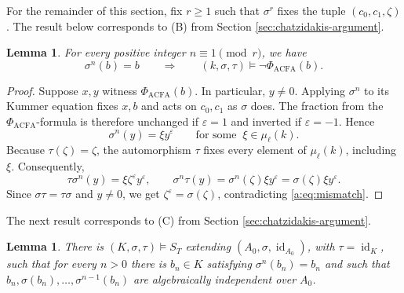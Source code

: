 \documentclass[11pt,a4paper]{amsart}
\renewcommand{\ge}{\geqslant}
\newtheorem{lemma}[theorem]{Lemma}
\theoremstyle{definition}
\DeclareMathOperator{\id}{id}
\begin{document}
For the remainder of this section, fix $r\ge1$ such that
$\sigma^r$ fixes the tuple $(c_0,c_1,\zeta)$. The result below corresponds to (B) from Section \ref{sec:chatzidakis-argument}.
\begin{lemma}\label{a:lem:obstruction}
For every positive integer $n\equiv1\pmod r$, we have
\[
\sigma^n(b)=b
\qquad\Longrightarrow\qquad
(k,\sigma,\tau)\models\neg\Phi_{\mathrm{ACFA}}(b).
\]
\end{lemma}

\begin{proof}
Suppose $x,y$ witness $\Phi_{\mathrm{ACFA}}(b)$. In particular, $y\neq0$. Applying $\sigma^n$ to its Kummer equation fixes $x,b$ and acts on $c_0,c_1$ as $\sigma$ does. The fraction from the $\Phi_{\mathrm{ACFA}}$-formula is therefore unchanged if $\varepsilon=1$ and inverted if $\varepsilon=-1$. Hence
\[
 \sigma^n(y)=\xi y^\varepsilon\qquad\text{for some }\ \xi\in\mu_\ell(k).
\]
Because $\tau(\zeta)=\zeta$, the automorphism $\tau$ fixes every element of $\mu_\ell(k)$, including $\xi$. Consequently,
\[
 \tau\sigma^n(y)=\xi\zeta^\varepsilon y^\varepsilon,\qquad
 \sigma^n\tau(y)=\sigma^n(\zeta)\xi y^\varepsilon
                 =\sigma(\zeta)\xi y^\varepsilon.
\]
Since $\sigma\tau=\tau\sigma$ and $y\neq0$, we get $\zeta^\varepsilon=\sigma(\zeta)$, contradicting \eqref{a:eq:mismatch}.
\end{proof}
The next result corresponds to (C) from Section \ref{sec:chatzidakis-argument}.
\begin{lemma}\label{a:lem:obstruction_exists}
There is $(K,\sigma,\tau)\models S_T$ extending
$(A_0,\sigma,\id_{A_0})$, with $\tau=\id_K$, such that
for every $n>0$ there is $b_n\in K$ satisfying
$\sigma^n(b_n)=b_n$ and such that
$b_n,\sigma(b_n),\ldots,\sigma^{n-1}(b_n)$
are algebraically independent over $A_0$.
\end{lemma}
\end{document}
